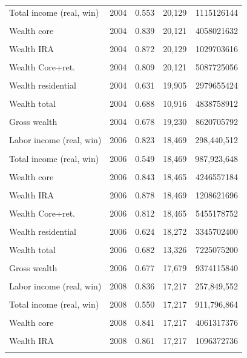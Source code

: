 \begin{table}[htbp]
\begin{tabular}{llrrr}
Total income (real, win) & 2004 & 0.553 & 20,129 & 1115126144 \\\\
Wealth core & 2004 & 0.839 & 20,121 & 4058021632 \\\\
Wealth IRA & 2004 & 0.872 & 20,129 & 1029703616 \\\\
Wealth Core+ret. & 2004 & 0.809 & 20,121 & 5087725056 \\\\
Wealth residential & 2004 & 0.631 & 19,905 & 2979655424 \\\\
Wealth total & 2004 & 0.688 & 10,916 & 4838758912 \\\\
Gross wealth & 2004 & 0.678 & 19,230 & 8620705792 \\\\
Labor income (real, win) & 2006 & 0.823 & 18,469 & 298,440,512 \\\\
Total income (real, win) & 2006 & 0.549 & 18,469 & 987,923,648 \\\\
Wealth core & 2006 & 0.843 & 18,465 & 4246557184 \\\\
Wealth IRA & 2006 & 0.878 & 18,469 & 1208621696 \\\\
Wealth Core+ret. & 2006 & 0.812 & 18,465 & 5455178752 \\\\
Wealth residential & 2006 & 0.624 & 18,272 & 3345702400 \\\\
Wealth total & 2006 & 0.682 & 13,326 & 7225075200 \\\\
Gross wealth & 2006 & 0.677 & 17,679 & 9374115840 \\\\
Labor income (real, win) & 2008 & 0.836 & 17,217 & 257,849,552 \\\\
Total income (real, win) & 2008 & 0.550 & 17,217 & 911,796,864 \\\\
Wealth core & 2008 & 0.841 & 17,217 & 4061317376 \\\\
Wealth IRA & 2008 & 0.861 & 17,217 & 1096372736 \\\\

\end{tabular}
\end{table}
